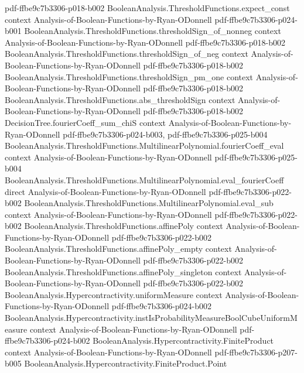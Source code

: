 \begin{theorem}
  {pdf-ffbe9c7b3306-p018-b002}
\proofstep
  {BooleanAnalysis.ThresholdFunctions.expect_const}
  {context}
  {Analysis-of-Boolean-Functions-by-Ryan-ODonnell}
  {pdf-ffbe9c7b3306-p024-b001}
\proofstep
  {BooleanAnalysis.ThresholdFunctions.thresholdSign_of_nonneg}
  {context}
  {Analysis-of-Boolean-Functions-by-Ryan-ODonnell}
  {pdf-ffbe9c7b3306-p018-b002}
\proofstep
  {BooleanAnalysis.ThresholdFunctions.thresholdSign_of_neg}
  {context}
  {Analysis-of-Boolean-Functions-by-Ryan-ODonnell}
  {pdf-ffbe9c7b3306-p018-b002}
\proofstep
  {BooleanAnalysis.ThresholdFunctions.thresholdSign_pm_one}
  {context}
  {Analysis-of-Boolean-Functions-by-Ryan-ODonnell}
  {pdf-ffbe9c7b3306-p018-b002}
\proofstep
  {BooleanAnalysis.ThresholdFunctions.abs_thresholdSign}
  {context}
  {Analysis-of-Boolean-Functions-by-Ryan-ODonnell}
  {pdf-ffbe9c7b3306-p018-b002}
\proofstep
  {DecisionTree.fourierCoeff_sum_chiS}
  {context}
  {Analysis-of-Boolean-Functions-by-Ryan-ODonnell}
  {pdf-ffbe9c7b3306-p024-b003,
    pdf-ffbe9c7b3306-p025-b004}
\proofstep
  {BooleanAnalysis.ThresholdFunctions.MultilinearPolynomial.fourierCoeff_eval}
  {context}
  {Analysis-of-Boolean-Functions-by-Ryan-ODonnell}
  {pdf-ffbe9c7b3306-p025-b004}
\proofstep
  {BooleanAnalysis.ThresholdFunctions.MultilinearPolynomial.eval_fourierCoeff}
  {direct}
  {Analysis-of-Boolean-Functions-by-Ryan-ODonnell}
  {pdf-ffbe9c7b3306-p022-b002}
\proofstep
  {BooleanAnalysis.ThresholdFunctions.MultilinearPolynomial.eval_sub}
  {context}
  {Analysis-of-Boolean-Functions-by-Ryan-ODonnell}
  {pdf-ffbe9c7b3306-p022-b002}
\proofstep
  {BooleanAnalysis.ThresholdFunctions.affinePoly}
  {context}
  {Analysis-of-Boolean-Functions-by-Ryan-ODonnell}
  {pdf-ffbe9c7b3306-p022-b002}
\proofstep
  {BooleanAnalysis.ThresholdFunctions.affinePoly_empty}
  {context}
  {Analysis-of-Boolean-Functions-by-Ryan-ODonnell}
  {pdf-ffbe9c7b3306-p022-b002}
\proofstep
  {BooleanAnalysis.ThresholdFunctions.affinePoly_singleton}
  {context}
  {Analysis-of-Boolean-Functions-by-Ryan-ODonnell}
  {pdf-ffbe9c7b3306-p022-b002}
\proofstep
  {BooleanAnalysis.Hypercontractivity.uniformMeasure}
  {context}
  {Analysis-of-Boolean-Functions-by-Ryan-ODonnell}
  {pdf-ffbe9c7b3306-p024-b002}
\proofstep
  {BooleanAnalysis.Hypercontractivity.instIsProbabilityMeasureBoolCubeUniformMeasure}
  {context}
  {Analysis-of-Boolean-Functions-by-Ryan-ODonnell}
  {pdf-ffbe9c7b3306-p024-b002}
\proofstep
  {BooleanAnalysis.Hypercontractivity.FiniteProduct}
  {context}
  {Analysis-of-Boolean-Functions-by-Ryan-ODonnell}
  {pdf-ffbe9c7b3306-p207-b005}
\proofstep
  {BooleanAnalysis.Hypercontractivity.FiniteProduct.Point}

\end{theorem}
